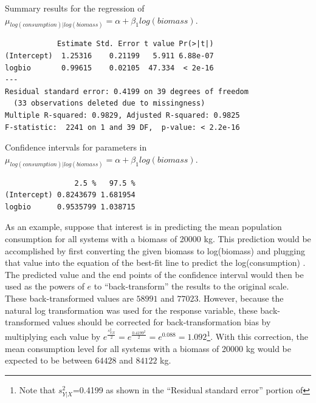 \documentclass[10pt,openany]{book}\usepackage[]{graphicx}\usepackage[]{color}
\makeatletter
\newenvironment{kframe}{%
 \def\at@end@of@kframe{}%
 \ifinner\ifhmode%
  \def\at@end@of@kframe{\end{minipage}}%
  \begin{minipage}{\columnwidth}%
 \fi\fi%
 \def\FrameCommand##1{\hskip\@totalleftmargin \hskip-\fboxsep
 \colorbox{shadecolor}{##1}\hskip-\fboxsep
     \hskip-\linewidth \hskip-\@totalleftmargin \hskip\columnwidth}%
 \MakeFramed {\advance\hsize-\width
   \@totalleftmargin\z@ \linewidth\hsize
   \@setminipage}}%
 {\par\unskip\endMakeFramed%
 \at@end@of@kframe}
\newenvironment{knitrout}{}{} %
\makeatother
\begin{document}
\begin{table}[h]
  \centering
  \caption{Summary results for the regression of $\mu_{log(consumption)|log(biomass)} = \alpha + \beta_{1}log(biomass)$.}\label{tab:SLRFCCoef}
\begin{knitrout}
\color{fgcolor}\begin{kframe}
\begin{verbatim}
            Estimate Std. Error t value Pr(>|t|)
(Intercept)  1.25316    0.21199   5.911 6.88e-07
logbio       0.99615    0.02105  47.334  < 2e-16
---
Residual standard error: 0.4199 on 39 degrees of freedom
  (33 observations deleted due to missingness)
Multiple R-squared: 0.9829,	Adjusted R-squared: 0.9825 
F-statistic:  2241 on 1 and 39 DF,  p-value: < 2.2e-16 
\end{verbatim}
\end{kframe}
\end{knitrout}
\end{table}

\begin{table}[h]
  \centering
  \caption{Confidence intervals for parameters in $\mu_{log(consumption)|log(biomass)} = \alpha + \beta_{1}log(biomass)$.}\label{tab:SLRFCCoefCI}
\begin{knitrout}
\color{fgcolor}\begin{kframe}
\begin{verbatim}
                2.5 %   97.5 %
(Intercept) 0.8243679 1.681954
logbio      0.9535799 1.038715
\end{verbatim}
\end{kframe}
\end{knitrout}
\end{table}

As an example, suppose that interest is in predicting the mean population consumption for all systems with a biomass of 20000 kg.  This prediction would be accomplished by first converting the given biomass to log(biomass) and plugging that value into the equation of the best-fit line to predict the log(consumption) .  The predicted value and the end points of the confidence interval would then be used as the powers of $e$ to ``back-transform'' the results to the original scale.  These back-transformed values are $58991$ and $77023$.  However, because the natural log transformation was used for the response variable, these back-transformed values should be corrected for back-transformation bias by multiplying each value by $e^{\frac{s^{2}_{Y|X}}{2}}$$=e^{\frac{0.4199^{2}}{2}}$$=e^{0.088}$$=1.092$\footnote{Note that $s^{2}_{Y|X}$=0.4199 as shown in the ``Residual standard error'' portion of }.  With this correction, the mean consumption level for all systems with a biomass of 20000 kg would be expected to be between $64428$ and $84122$ kg.
\end{document}
